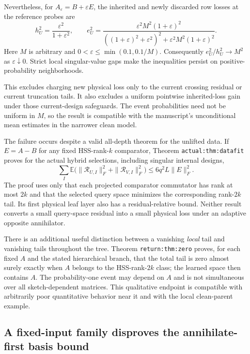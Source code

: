 \documentclass[11pt,oneside,openany,a4paper]{report}
\numberwithin{equation}{chapter}
\theoremstyle{definition}
\theoremstyle{remark}
\begin{document}
Nevertheless, for $A_\varepsilon=B+\varepsilon E$, the inherited
and newly discarded row losses at the reference probes are
\[
 h_U^2=\frac{\varepsilon^2}{1+\varepsilon^2},\qquad
 e_U^2=
 \frac{\varepsilon^2M^2(1+\varepsilon)^2}
 {((1+\varepsilon)^2+\varepsilon^2)^2+
                  \varepsilon^2M^2(1+\varepsilon)^2}.
\]
Here $M$ is arbitrary and
$0<\varepsilon\le\min(0.1,0.1/M)$.  Consequently
$e_U^2/h_U^2\to M^2$ as $\varepsilon\downarrow0$.
Strict local singular-value gaps make the inequalities persist on
positive-probability neighborhoods.

This excludes charging new physical loss only to the current
crossing residual or current truncation tails.  It also excludes a
uniform pointwise inherited-loss gain under those current-design
safeguards.  The event probabilities need not be uniform in $M$,
so the result is compatible with the manuscript's unconditional
mean estimates in the narrower clean model.

The failure occurs despite a valid all-depth theorem for the
unlifted data.  If $E=A-B$ for any fixed HSS-rank-$k$ comparator,
Theorem \texttt{actual:thm:datafit} proves for the actual hybrid
selections, including singular internal designs,
\[
 \sum_I\mathbb E\bigl(
       \|\mathcal R_{U,I}\|_F^2+\|\mathcal R_{V,I}\|_F^2\bigr)
       \le6q^2L\|E\|_F^2.
\]
The proof uses only that each projected comparator commutator has
rank at most $2k$ and that the selected query space minimizes
the corresponding rank-$2k$ tail.  Its first physical leaf
layer also has a residual-relative bound.  Neither result
converts a small query-space residual into a small physical
loss under an adaptive opposite annihilator.

There is an additional useful distinction between a vanishing
\emph{local} tail and vanishing tails throughout the tree.
Theorem \texttt{return:thm:zero} proves, for each fixed $A$ and
the stated hierarchical branch, that the total tail is zero
almost surely exactly when $A$ belongs to the HSS-rank-$2k$
class; the learned space then contains $A$.  The probability-one
event may depend on $A$ and is not simultaneous over all
sketch-dependent matrices.  This qualitative endpoint is
compatible with arbitrarily poor quantitative behavior near
it and with the local clean-parent example.

\subsection{A fixed-input family disproves the annihilate-first basis bound}
\end{document}
